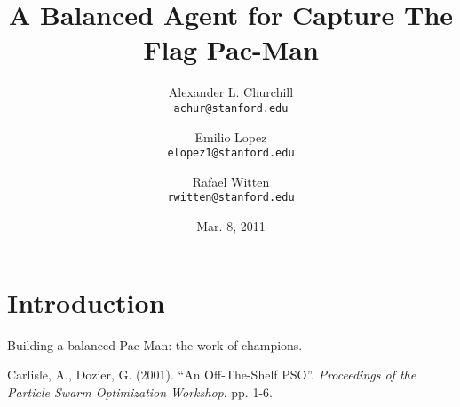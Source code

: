 \documentclass[12pt]{article}
\title{A Balanced Agent for Capture The Flag Pac-Man}
\author{
Alexander L. Churchill\\
\small \texttt{achur@stanford.edu}\\
\and
Emilio Lopez\\
\small \texttt{elopez1@stanford.edu}\\
\and
Rafael Witten\\
\small \texttt{rwitten@stanford.edu}
}
\date{Mar. 8, 2011}
\begin{document}
\maketitle
\section{Introduction}
Building a balanced Pac Man: the work of champions.


\begin{thebibliography}{99}

 Carlisle, A., Dozier, G. (2001). ``An Off-The-Shelf PSO''.
  {\it Proceedings of the Particle Swarm Optimization Workshop}. pp. 1-6. 

\end{thebibliography}
\end{document}
